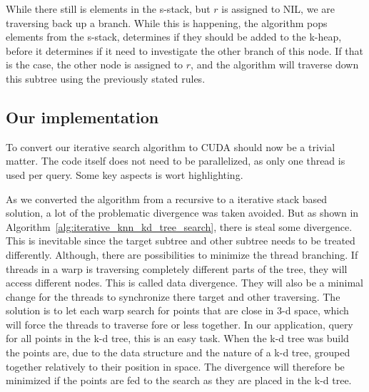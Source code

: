 While there still is elements in the s-stack, but $r$ is assigned to NIL, we are traversing back up a branch. While this is happening, the algorithm pops elements from the s-stack, determines if they should be added to the k-heap, before it determines if it need to investigate the other branch of this node. If that is the case, the other node is assigned to $r$, and the algorithm will traverse down this subtree using the previously stated rules.



\subsection{Our implementation} %
\label{sub:our_implementation}

To convert our iterative search algorithm to CUDA should now be a trivial matter. The code itself does not need to be parallelized, as only one thread is used per query. Some key aspects is wort highlighting.


As we converted the algorithm from a recursive to a iterative stack based solution, a lot of the problematic divergence was taken avoided. But as shown in Algorithm~\ref{alg:iterative_knn_kd_tree_search}, there is steal some divergence. This is inevitable since the target subtree and other subtree needs to be treated differently. Although, there are possibilities to minimize the thread branching. If threads in a warp is traversing completely different parts of the tree, they will access different nodes. This is called data divergence. They will also be a minimal change for the threads to synchronize there target and other traversing. The solution is to let each warp search for points that are close in 3-d space, which will force the threads to traverse fore or less together. In our application, query for all points in the k-d tree, this is an easy task. When the k-d tree was build the points are, due to the data structure and the nature of a k-d tree, grouped together relatively to their position in space. The divergence will therefore be minimized if the points are fed to the search as they are placed in the k-d tree.


